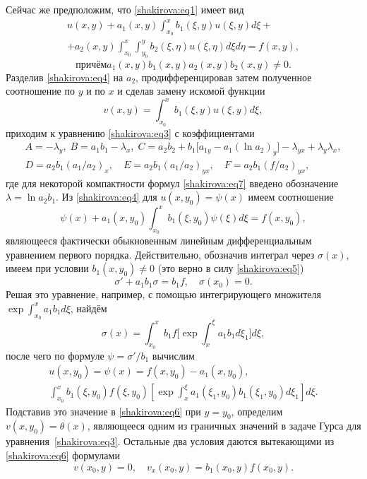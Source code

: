 Сейчас же предположим, что \eqref{shakirova:eq1} имеет вид
\begin{multline}
\label{shakirova:eq4}
u(x,y)+a_1(x,y)\int_{x_0}^x b_1(\xi,y)u(\xi,y)d\xi+ \\ +
a_2(x,y)\int_{x_0}^x \int_{y_0}^y b_2(\xi,\eta)u(\xi,\eta)d\xi d\eta=f(x,y),
\end{multline}
\begin{equation}
причём
\label{shakirova:eq5}
a_1(x,y)b_1(x,y)a_2(x,y)b_2(x,y)\neq 0.
\end{equation}
Разделив \eqref{shakirova:eq4} на $a_2$, продифференцировав затем полученное соотношение по $y$ и по $x$ и сделав замену искомой функции
\begin{equation}
\label{shakirova:eq6}
v(x,y)=\int_{x_0}^x b_1(\xi,y)u(\xi,y)d\xi,
\end{equation}
приходим к уравнению \eqref{shakirova:eq3} с коэффициентами
\begin{equation}
\label{shakirova:eq7}
\begin{array}{c}
A=-\lambda_y,\;  B=a_1b_1-\lambda_x, \;  C=a_2b_2+b_1\bigl[a_{1y}-a_1(\ln a_2)_y\bigr]-\lambda_{yx}+\lambda_y\lambda_x,
\\[2mm]
D=a_2b_1\left({a_1}/{a_2}\right)_x,\quad E=a_2b_1\left({a_1}/{a_2}\right)_{yx},\quad F=a_2b_1\left({f}/{a_2}\right)_{yx},
\end{array}
\end{equation}
где для некоторой компактности формул \eqref{shakirova:eq7} введено обозначение $\lambda=\ln a_2b_1$.
Из \eqref{shakirova:eq4} для $u(x,y_0)=\psi(x)$ имеем  соотношение
$$
\psi(x)+a_1(x,y_0)\int_{x_0}^x b_1(\xi,y_0)\psi(\xi)d\xi=f(x,y_0),
$$
являющееся фактически обыкновенным линейным дифференциальным уравнением первого порядка. 
Действительно, обозначив интеграл через $\sigma(x)$, имеем при условии $b_1(x,y_0)\neq0$ (это верно в силу \eqref{shakirova:eq5})
$$
\sigma'+a_1b_1\sigma=b_1f, \quad \sigma(x_0)=0.
$$
Решая это уравнение, например, с помощью интегрирующего множителя \linebreak $\displaystyle \exp \int_{x_0}^x a_1b_1d\xi$, найдём $$\sigma(x)=\int_{x_0}^xb_1f\biggl[\exp \int_x^{\xi} a_1b_1d\xi_1\biggr]d\xi,$$ 
после чего по формуле $\psi={\sigma'}/{b_1}$ вычислим
\begin{gather}
u(x, y_0)=\psi(x)=f(x,y_0)-a_1(x,y_0),
\\
\int_{x_0}^xb_1(\xi,y_0)f(\xi, y_0)\left[\exp \int_x^{\xi} a_1(\xi_1, y_0)b_1(\xi_1,y_0)d\xi_1\right]d\xi.
\end{gather}
Подставив это значение в \eqref{shakirova:eq6} при $y=y_0$, определим $v(x, y_0)=\theta(x)$, являющееся одним из граничных значений в задаче Гурса для уравнения~\eqref{shakirova:eq3}. 
Остальные два условия даются вытекающими из \eqref{shakirova:eq6} формулами
\begin{equation}
\label{shakirova:eq8}
v(x_0 ,y)=0,\quad v_x(x_0, y)=b_1(x_0, y)f(x_0, y).
\end{equation}

